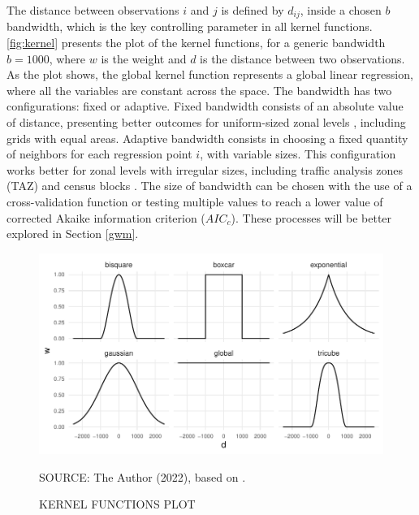 The distance between observations $i$ and $j$ is defined by $d_{ij}$, inside a chosen $b$ bandwidth, which is the key controlling parameter in all kernel functions. \autoref{fig:kernel} presents the plot of the kernel functions, for a generic bandwidth $b = 1000$, where $w$ is the weight and $d$ is the distance between two observations. As the plot shows, the global kernel function represents a global linear regression, where all the variables are constant across the space. The bandwidth has two configurations: fixed or adaptive. Fixed bandwidth consists of an absolute value of distance, presenting better outcomes for uniform-sized zonal levels \cite{Huang2018}, including grids with equal areas. Adaptive bandwidth consists in choosing a fixed quantity of neighbors for each regression point $i$, with variable sizes. This configuration works better for zonal levels with irregular sizes, including traffic analysis zones (TAZ) and census blocks \cite{Yu2017}. The size of bandwidth can be chosen with the use of a cross-validation function or testing multiple values to reach a lower value of corrected Akaike information criterion ($AIC_c$). These processes will be better explored in Section \ref{gwm}.

\begin{figure}[!htbp]
    \centering\footnotesize
    \captionsetup{font=footnotesize}
    \caption{KERNEL FUNCTIONS PLOT}
    \includegraphics{fig/kernel.pdf}
    \label{fig:kernel}
    \par SOURCE: The Author (2022), based on \textcite{Gollini2013}.
\end{figure}

